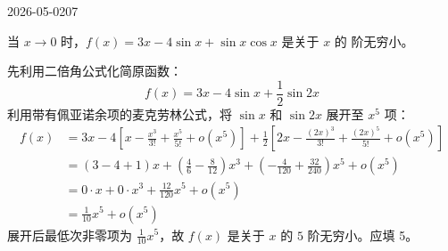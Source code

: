 \begin{mistake}{2026-05-02}{07}

\begin{problemcontent}
当 \(x \to 0\) 时，\(f(x) = 3x - 4\sin x + \sin x \cos x\) 是关于 \(x\) 的 \underline{\hspace{1.5cm}} 阶无穷小。
\end{problemcontent}

\begin{solutioncontent}
先利用二倍角公式化简原函数：
\[ f(x) = 3x - 4\sin x + \frac{1}{2}\sin 2x \]
利用带有佩亚诺余项的麦克劳林公式，将 \(\sin x\) 和 \(\sin 2x\) 展开至 \(x^5\) 项：
\[
\begin{aligned}
f(x) &= 3x - 4\left[x - \frac{x^3}{3!} + \frac{x^5}{5!} + o(x^5)\right] + \frac{1}{2}\left[2x - \frac{(2x)^3}{3!} + \frac{(2x)^5}{5!} + o(x^5)\right] \\
&= (3 - 4 + 1)x + \left(\frac{4}{6} - \frac{8}{12}\right)x^3 + \left(-\frac{4}{120} + \frac{32}{240}\right)x^5 + o(x^5) \\
&= 0 \cdot x + 0 \cdot x^3 + \frac{12}{120}x^5 + o(x^5) \\
&= \frac{1}{10}x^5 + o(x^5)
\end{aligned}
\]
展开后最低次非零项为 \(\frac{1}{10}x^5\)，故 \(f(x)\) 是关于 \(x\) 的 \(5\) 阶无穷小。应填 5。
\end{solutioncontent}


\end{mistake}
